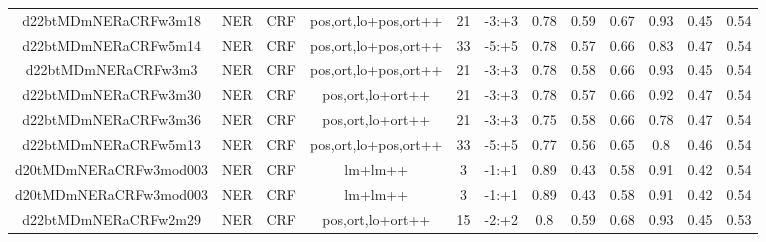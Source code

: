 \documentclass[a4paper]{article}
\begin{document}
\begin{landscape}
\begin{center}
\begin{tabular}{ |c|c|c|c|c|c|c|c|c|c|c|c|}
 	
 
 	
 		
 		\small{ d22btMDmNERaCRFw3m18 } & NER & CRF & pos,ort,lo+pos,ort++  &  21 &  -3:+3  &  0.78 & 0.59 & 0.67  &  0.93 & 0.45 & 0.54 \\
 		

 	
 
 	
 		
 		\small{ d22btMDmNERaCRFw5m14 } & NER & CRF & pos,ort,lo+pos,ort++  &  33 &  -5:+5  &  0.78 & 0.57 & 0.66  &  0.83 & 0.47 & 0.54 \\
 		

 	
 
 	
 		
 		\small{ d22btMDmNERaCRFw3m3 } & NER & CRF & pos,ort,lo+pos,ort++  &  21 &  -3:+3  &  0.78 & 0.58 & 0.66  &  0.93 & 0.45 & 0.54 \\
 		

 	
 
 	
 		
 		\small{ d22btMDmNERaCRFw3m30 } & NER & CRF & pos,ort,lo+ort++  &  21 &  -3:+3  &  0.78 & 0.57 & 0.66  &  0.92 & 0.47 & 0.54 \\
 		

 	
 
 	
 		
 		\small{ d22btMDmNERaCRFw3m36 } & NER & CRF & pos,ort,lo+ort++  &  21 &  -3:+3  &  0.75 & 0.58 & 0.66  &  0.78 & 0.47 & 0.54 \\
 		

 	
 
 	
 		
 		\small{ d22btMDmNERaCRFw5m13 } & NER & CRF & pos,ort,lo+pos,ort++  &  33 &  -5:+5  &  0.77 & 0.56 & 0.65  &  0.8 & 0.46 & 0.54 \\
 		

 	
 
 	
 		
 		\small{ d20tMDmNERaCRFw3mod003 } & NER & CRF & lm+lm++  &  3 &  -1:+1  &  0.89 & 0.43 & 0.58  &  0.91 & 0.42 & 0.54 \\
 		

 	
 
 	
 		
 		\small{ d20tMDmNERaCRFw3mod003 } & NER & CRF & lm+lm++  &  3 &  -1:+1  &  0.89 & 0.43 & 0.58  &  0.91 & 0.42 & 0.54 \\
 		

 	
 
 	
 		
 		\small{ d22btMDmNERaCRFw2m29 } & NER & CRF & pos,ort,lo+ort++  &  15 &  -2:+2  &  0.8 & 0.59 & 0.68  &  0.93 & 0.45 & 0.53 \\
 		


\end{tabular}
\end{center}
\end{landscape}
\end{document}

